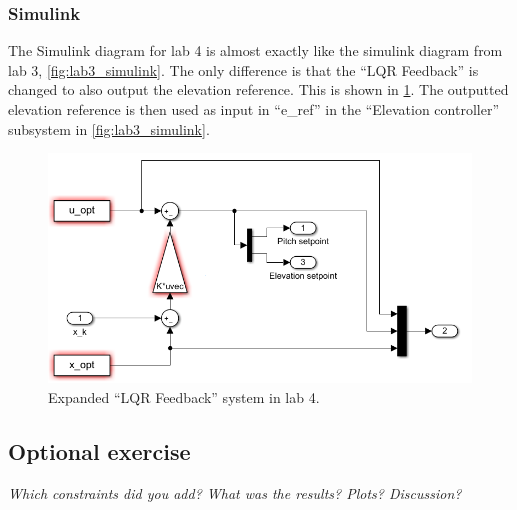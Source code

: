 \documentclass[../main.tex]{subfiles}
\begin{document}
\subsubsection{Simulink}
The Simulink diagram for lab 4 is almost exactly like the simulink diagram from lab 3, \cref{fig:lab3_simulink}. The only difference is that the ``LQR Feedback'' is changed to also output the elevation reference. This is shown in \cref{fig:lab4_simulink_lqr}. The outputted elevation reference is then used as input in ``e\_ref'' in the ``Elevation controller'' subsystem in \cref{fig:lab3_simulink}. 
\begin{figure}[h]
	\centering
	\includegraphics[width=1\linewidth, keepaspectratio]{code/lab4_simulink_2}
	\caption{Expanded ``LQR Feedback'' system in lab 4.}
	\label{fig:lab4_simulink_lqr}
\end{figure}
\subsection{Optional exercise}
\textit{Which constraints did you add? What was the results? Plots? Discussion?}
\end{document}
